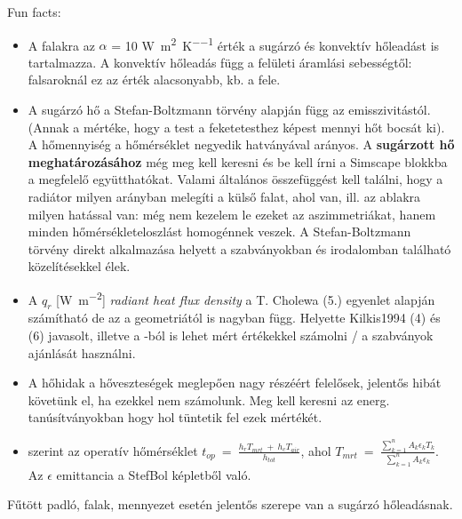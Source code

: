 Fun facts:
~
\begin{itemize}[itemsep=6pt,topsep=0pt,parsep=0pt,partopsep=0pt]
	\item A falakra az $\alpha$ = 10 \si[per-mode = fraction]{\watt\per\meter\squared\per\kelvin} érték a sugárzó és konvektív hőleadást is tartalmazza. A konvektív hőleadás függ a felületi áramlási sebességtől: falsaroknál ez az érték alacsonyabb, kb. a fele.
	\item A sugárzó hő a Stefan-Boltzmann törvény alapján függ az emisszivitástól. (Annak a mértéke, hogy a test a feketetesthez képest mennyi hőt bocsát ki). A hőmennyiség a hőmérséklet negyedik hatványával arányos. A \textbf{sugárzott hő meghatározásához} még meg kell keresni és be kell írni a Simscape blokkba a megfelelő együtthatókat. Valami általános összefüggést kell találni, hogy a radiátor milyen arányban melegíti a külső falat, ahol van, ill. az ablakra milyen hatással van: még nem kezelem le ezeket az aszimmetriákat, hanem minden hőmérsékleteloszlást homogénnek veszek. A Stefan-Boltzmann törvény direkt alkalmazása helyett a szabványokban és irodalomban található közelítésekkel élek.
	\item A $q_r$ [\si[per-mode = fraction]{\watt\per\meter\squared}] \textit{radiant heat flux density} a \cite{CHOLEWA2013599} T. Cholewa
	(5.) egyenlet alapján számítható de az a geometriától is nagyban függ. Helyette Kilkis1994 (4) és (6) javasolt, illetve a \cite{CHOLEWA2013599}-ból is lehet mért értékekkel számolni / a szabványok ajánlását használni.
	\item A hőhidak a hőveszteségek meglepően nagy részéért felelősek, jelentős hibát követünk el, ha ezekkel nem számolunk. Meg kell keresni az energ. tanúsítványokban hogy hol tüntetik fel ezek mértékét.
	\item \cite[5.188.~o.]{watson2002radiant} szerint az operatív hőmérséklet $t_{op}~=~\frac{h_rT_{mrt}~+~h_cT_{air}}{h_{tot}}$, ahol $T_{mrt}~=~\frac{\sum\limits_{k=1}^{n}A_k\epsilon_kT_k}{\sum\limits_{k=1}^{n}A_k\epsilon_k}$. Az $\epsilon$ emittancia a StefBol képletből való.
	
	
\end{itemize} 

Fűtött padló, falak, mennyezet esetén jelentős szerepe van a sugárzó hőleadásnak.

